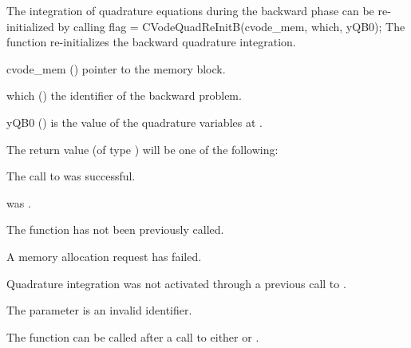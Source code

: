 The integration of quadrature equations during the backward phase can be
re-initialized by calling
{
  flag = CVodeQuadReInitB(cvode\_mem, which, yQB0);
}
{
  The function  re-initializes the backward quadrature integration.
}
{
  \begin{args}
  \item[cvode\_mem] ()
    pointer to the {\cvodes} memory block.
  \item[which] ()
    the identifier of the backward problem.
  \item[yQB0] ()
    is the value of the quadrature variables at .
  \end{args}
}
{
  The return value  (of type ) will be one of the following:
  \begin{args}
  \item[\Id{CV\_SUCCESS}]
    The call to  was successful.
 \item[\Id{CV\_MEM\_NULL}] 
     was .
  \item[\Id{CV\_NO\_ADJ}]
    The function  has not been previously called.
  \item[\Id{CV\_MEM\_FAIL}] 
    A memory allocation request has failed.
  \item[\Id{CV\_NO\_QUAD}] 
    Quadrature integration was not activated through a  previous 
    call to .
  \item[\Id{CV\_ILL\_INPUT}]
    The parameter  is an invalid identifier.
  \end{args}
}
{
  The function  can be called after a call to either
   or .
}

